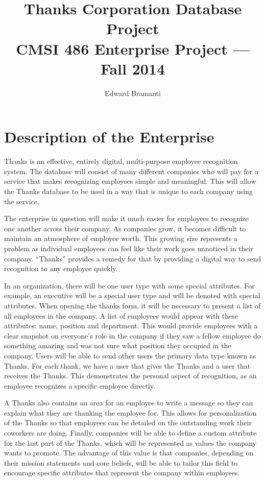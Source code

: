\documentclass[11pt]{report}
\title{Thanks Corporation Database Project\\CMSI 486 Enterprise Project --- Fall 2014}
\author{Edward Bramanti}
\providecommand\phantomsection{}
\begin{document}
\clearpage
\phantomsection
{}
\maketitle
\clearpage
\phantomsection
{}
\tableofcontents
\setcounter{page}{2}
\setcounter{chapter}{2}
\chapter{Description of the Enterprise}

Thanks is an effective, entirely digital, multi-purpose employee recognition system. The database will consist of many different companies who will pay for a service that makes recognizing employees simple and meaningful. This will allow the Thanks database to be used in a way that is unique to each company using the service.

The enterprise in question will make it much easier for employees to recognize one another across their company. As companies grow, it becomes difficult to maintain an atmosphere of employee worth. This growing size represents a problem as individual employees can feel like their work goes unnoticed in their company. “Thanks” provides a remedy for that by providing a digital way to send recognition to any employee quickly.

In an organization, there will be one user type with some special attributes. For example, an executive will be a special user type and will be denoted with special attributes. When opening the thanks form, it will be necessary to present a list of all employees in the company. A list of employees would appear with these attributes: name, position and department. This would provide employees with a clear snapshot on everyone’s role in the company if they saw a fellow employee do something amazing and was not sure what position they occupied in the company. Users will be able to send other users the primary data type known as Thanks. For each thank, we have a user that gives the Thanks and a user that receives the Thanks. This demonstrates the personal aspect of recognition, as an employee recognizes a specific employee directly.

A Thanks also contains an area for an employee to write a message so they can explain what they are thanking the employee for. This allows for personalization of the Thanks so that employees can be detailed on the outstanding work their coworkers are doing. Finally, companies will be able to define a custom attribute for the last part of the Thanks, which will be represented as values the company wants to promote. The advantage of this value is that companies, depending on their mission statements and core beliefs, will be able to tailor this field to encourage specific attributes that represent the company within employees.
\end{document}
